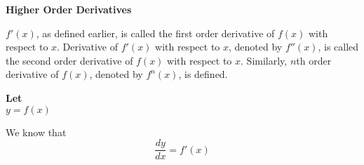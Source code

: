 \textbf{Higher Order Derivatives}

\( f'(x) \), as defined earlier, is called the first order derivative of \( f(x) \) with respect to \( x \). Derivative of \( f'(x) \) with respect to \( x \), denoted by \( f''(x) \), is called the second order derivative of \( f(x) \) with respect to \( x \). Similarly, \( n \)th order derivative of \( f(x) \), denoted by \( f^n(x) \), is defined.

\textbf{Let} \\
\( y = f(x) \)

We know that
\begin{equation}
    \frac{dy}{dx} = f'(x)
\end{equation}
